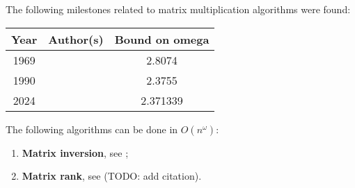 \noindent
The following milestones related to matrix multiplication algorithms were found:
\begin{center}
  \begin{tabular}{|c|c|c|}
    \hline
    Year & Author(s) & Bound on omega \\
    \hline
    1969 & \citet{Strassen1969} & 2.8074 \\ 
    1990 & \citet{COPPERSMITH1990} & 2.3755 \\
    2024 & \citet{2024asymmetryyieldsfastermatrix} & 2.371339 \\
    \hline
  \end{tabular}
\end{center}

\noindent
The following algorithms can be done in \(O(n^\omega)\):

\begin{enumerate}
  \item \textbf{Matrix inversion}, see \citet[Theorem 28.2]{CLRS}; 
  \item \textbf{Matrix rank}, see (TODO: add citation).
\end{enumerate}

